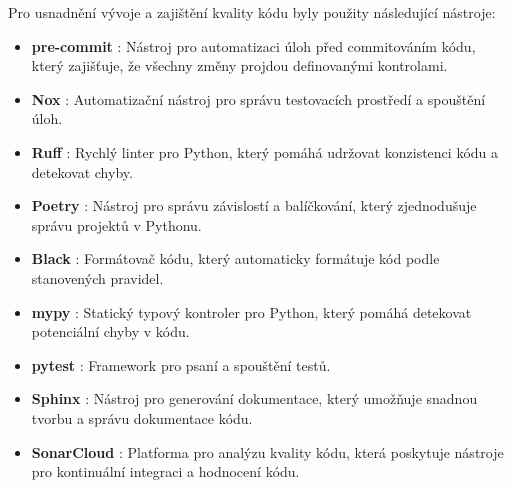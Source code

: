 Pro usnadnění vývoje a zajištění kvality kódu byly použity následující nástroje:
\begin{itemize}
    \item \textbf{pre-commit} \cite{precommit}: Nástroj pro automatizaci úloh před commitováním kódu, který zajišťuje, že všechny změny projdou definovanými kontrolami.
    \item \textbf{Nox} \cite{nox}: Automatizační nástroj pro správu testovacích prostředí a spouštění úloh.
    \item \textbf{Ruff} \cite{ruff}: Rychlý linter pro Python, který pomáhá udržovat konzistenci kódu a detekovat chyby.
    \item \textbf{Poetry} \cite{poetry}: Nástroj pro správu závislostí a balíčkování, který zjednodušuje správu projektů v Pythonu.
    \item \textbf{Black} \cite{black}: Formátovač kódu, který automaticky formátuje kód podle stanovených pravidel.
    \item \textbf{mypy} \cite{mypy}:  Statický typový kontroler pro Python, který pomáhá detekovat potenciální chyby v kódu.
    \item \textbf{pytest} \cite{pytest}: Framework pro psaní a spouštění testů.
    \item \textbf{Sphinx} \cite{sphinx}: Nástroj pro generování dokumentace, který umožňuje snadnou tvorbu a správu dokumentace kódu.
    \item \textbf{SonarCloud} \cite{sonarcloud}: Platforma pro analýzu kvality kódu, která poskytuje nástroje pro kontinuální integraci a hodnocení kódu.
\end{itemize}